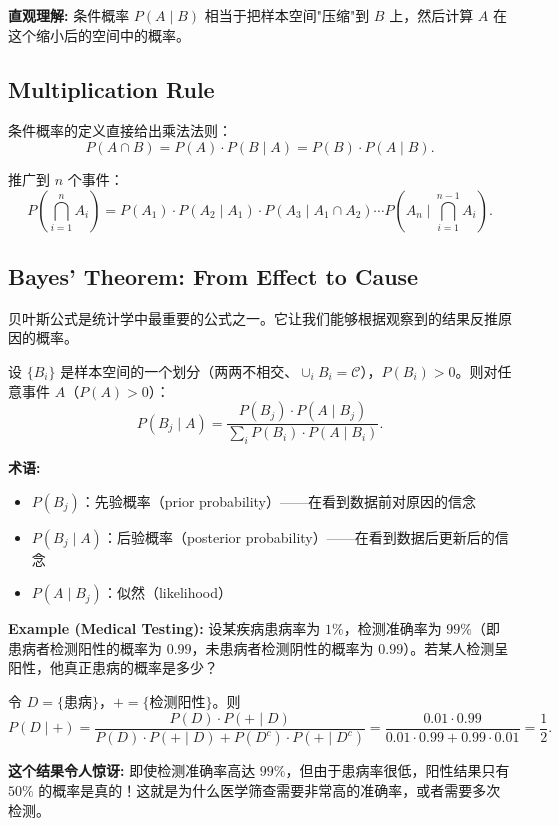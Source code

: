 \textbf{直观理解:} 条件概率 $P(A \mid B)$ 相当于把样本空间"压缩"到 $B$ 上，然后计算 $A$ 在这个缩小后的空间中的概率。

\subsection{Multiplication Rule}\label{sub:multiplication-rule}

条件概率的定义直接给出乘法法则：
\[
P(A \cap B) = P(A) \cdot P(B \mid A) = P(B) \cdot P(A \mid B).
\]

推广到 $n$ 个事件：
\[
P\left(\bigcap_{i=1}^{n} A_i\right) = P(A_1) \cdot P(A_2 \mid A_1) \cdot P(A_3 \mid A_1 \cap A_2) \cdots P\left(A_n \mid \bigcap_{i=1}^{n-1} A_i\right).
\]

\subsection{Bayes' Theorem: From Effect to Cause}\label{sub:bayes-theorem}

贝叶斯公式是统计学中最重要的公式之一。它让我们能够根据观察到的结果反推原因的概率。

\begin{Theorem}[贝叶斯公式]\label{eq:bayes-theorem}
设 $\{B_i\}$ 是样本空间的一个划分（两两不相交、$\cup_i B_i = \mathcal{C}$），$P(B_i) > 0$。则对任意事件 $A$（$P(A) > 0$）：
\[
P(B_j \mid A) = \frac{P(B_j) \cdot P(A \mid B_j)}{\sum_{i} P(B_i) \cdot P(A \mid B_i)}.
\]
\end{Theorem}

\textbf{术语:}
\begin{itemize}
    \item $P(B_j)$：先验概率（prior probability）——在看到数据前对原因的信念
    \item $P(B_j \mid A)$：后验概率（posterior probability）——在看到数据后更新后的信念
    \item $P(A \mid B_j)$：似然（likelihood）
\end{itemize}

\textbf{Example (Medical Testing):} 设某疾病患病率为 $1\%$，检测准确率为 $99\%$（即患病者检测阳性的概率为 $0.99$，未患病者检测阴性的概率为 $0.99$）。若某人检测呈阳性，他真正患病的概率是多少？

令 $D = \{\text{患病}\}$，$+ = \{\text{检测阳性}\}$。则
\[
P(D \mid +) = \frac{P(D) \cdot P(+ \mid D)}{P(D) \cdot P(+ \mid D) + P(D^c) \cdot P(+ \mid D^c)} = \frac{0.01 \cdot 0.99}{0.01 \cdot 0.99 + 0.99 \cdot 0.01} = \frac{1}{2}.
\]

\textbf{这个结果令人惊讶:} 即使检测准确率高达 $99\%$，但由于患病率很低，阳性结果只有 $50\%$ 的概率是真的！这就是为什么医学筛查需要非常高的准确率，或者需要多次检测。

